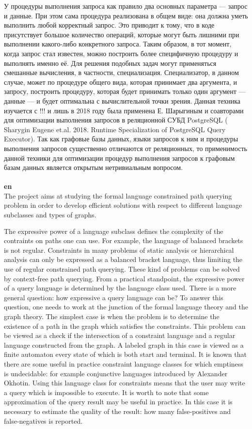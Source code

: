 \documentclass[12pt]{article}  %
\theoremstyle{remark}
\begin{document}
У процедуры выполнения запроса как правило два основных параметра --- запрос и данные.
При этом сама процедура реализована в общем виде: она должна уметь выполнить любой корректный запрос.
Это приводит к тому, что в коде присутствует большое количество операций, которые могут быть лишними при выполнении какого-либо конкретного запроса.
Таким образом, в тот момент, когда запрос стал известен, можно построить более специфичную процедуру и выполнять именно её.
Для решения подобных задач могут применяться смешанные вычисления, в частности, специализация.
Специализатор, в данном случае, может по процедуре общего вида, которая принимает два аргумента, и запросу, построить процедуру, которая будет принимать только один аргумент --- данные --- и будет оптимальна с вычислительной точки зрения. Данная техника изучается с !!! и лишь в 2018 году была применена Е. Шарыгиным и соавторами для оптимизации выполнения запросов в реляционной СУБД PostgreSQL ( Sharygin Eugene et.al. 2018. Runtime Specialization of PostgreSQL Query Executor). Так как графовые базы данных, языки запросов к ним и процедуры выполнения запросов существенно отличаются от реляционных, то применимость данной техники для оптимизации процедур выполнения запросов к графовым базам данных является открытым нетривиальным вопросом.
\\
\\
\textbf{en}\\


The project aims at studying the formal language constrained path querying problem in order to develop efficient solutions with respect to different language subclasses and types of graphs.

The expressive power of a language subclass defines the complexity of the contraints on paths one can use.
For example, the language of balanced brackets is not regular.
Constraints in many problems of static analysis or hierarchical analysis can only be expressed as a balanced bracket language, thus limiting the use of regular constrained path querying.
These kind of problems can be solved by context-free path querying.
From a practical standpoint, the expressive power of a query language is determined by the language class used.
There is a more general question: how expressive a query language can be?
To answer this question, one needs to work at the junction of the formal language theory and the graph theory.
The simplest case is when the problem is to determine the existence of a path in the graph which satisfies the constraints.
This problem can be viewed as a check if the intersection of a constraint language and a regular language constructed from the graph.
A labeled graph in this case is viewed as a finite automaton every state of which is both start and terminal.
It is known that there are some useful in practice constraint language classes for which emptiness is undecidable: for example conjunctive languages introduced by Alexander Okhotin.
Using this language class for constraints means that the user may write a query which is impossible to execute.
It is worth to note that some approximation of the query result may be useful in practice.
In this case it is necessary to estimate the quality of the result: how many false-positives and false-negatives is reported.
\end{document}
